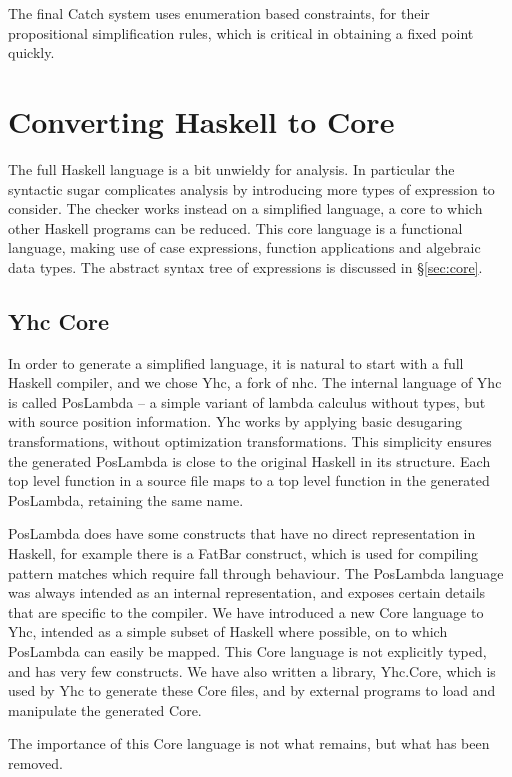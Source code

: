 \documentclass[preprint]{sigplanconf}
\begin{document}
The final Catch system uses enumeration based constraints, for their propositional simplification rules, which is critical in obtaining a fixed point quickly.

\section{Converting Haskell to Core}
\label{sec:transform}

The full Haskell language is a bit unwieldy for analysis. In particular the syntactic sugar complicates analysis by introducing more types of expression to consider. The checker works instead on a simplified language, a core to which other Haskell programs can be reduced. This core language is a functional language, making use of case expressions, function applications and algebraic data types. The abstract syntax tree of expressions is discussed in \S\ref{sec:core}.

\subsection{Yhc Core}

In order to generate a simplified language, it is natural to start with a full Haskell compiler, and we chose Yhc, a fork of nhc. The internal language of Yhc is called PosLambda -- a simple variant of lambda calculus without types, but with source position information. Yhc works by applying basic desugaring transformations, without optimization transformations. This simplicity ensures the generated PosLambda is close to the original Haskell in its structure. Each top level function in a source file maps to a top level function in the generated PosLambda, retaining the same name.

PosLambda does have some constructs that have no direct representation in Haskell, for example there is a FatBar construct, which is used for compiling pattern matches which require fall through behaviour. The PosLambda language was always intended as an internal representation, and exposes certain details that are specific to the compiler. We have introduced a new Core language to Yhc, intended as a simple subset of Haskell where possible, on to which PosLambda can easily be mapped. This Core language is not explicitly typed, and has very few constructs. We have also written a library, Yhc.Core, which is used by Yhc to generate these Core files, and by external programs to load and
manipulate the generated Core.

The importance of this Core language is not what remains, but what has been removed.
\end{document}
